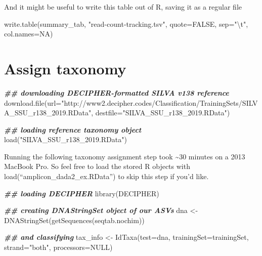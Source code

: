 \documentclass[
]{book}
\newenvironment{Shaded}{\begin{snugshade}}{\end{snugshade}}
\newcommand{\AttributeTok}[1]{\textcolor[rgb]{0.77,0.63,0.00}{#1}}
\newcommand{\ConstantTok}[1]{\textcolor[rgb]{0.00,0.00,0.00}{#1}}
\newcommand{\DocumentationTok}[1]{\textcolor[rgb]{0.56,0.35,0.01}{\textbf{\textit{#1}}}}
\newcommand{\FunctionTok}[1]{\textcolor[rgb]{0.00,0.00,0.00}{#1}}
\newcommand{\NormalTok}[1]{#1}
\newcommand{\OtherTok}[1]{\textcolor[rgb]{0.56,0.35,0.01}{#1}}
\newcommand{\SpecialCharTok}[1]{\textcolor[rgb]{0.00,0.00,0.00}{#1}}
\newcommand{\StringTok}[1]{\textcolor[rgb]{0.31,0.60,0.02}{#1}}
\begin{document}
And it might be useful to write this table out of R, saving it as a regular file

\begin{Shaded}
\begin{Highlighting}[]
\FunctionTok{write.table}\NormalTok{(summary\_tab, }\StringTok{"read{-}count{-}tracking.tsv"}\NormalTok{, }\AttributeTok{quote=}\ConstantTok{FALSE}\NormalTok{, }\AttributeTok{sep=}\StringTok{"}\SpecialCharTok{\textbackslash{}t}\StringTok{"}\NormalTok{, }\AttributeTok{col.names=}\ConstantTok{NA}\NormalTok{)}
\end{Highlighting}
\end{Shaded}

\hypertarget{assign-taxonomy}{%
\section{Assign taxonomy}\label{assign-taxonomy}}

\begin{Shaded}
\begin{Highlighting}[]
\DocumentationTok{\#\# downloading DECIPHER{-}formatted SILVA v138 reference}
\FunctionTok{download.file}\NormalTok{(}\AttributeTok{url=}\StringTok{"http://www2.decipher.codes/Classification/TrainingSets/SILVA\_SSU\_r138\_2019.RData"}\NormalTok{, }\AttributeTok{destfile=}\StringTok{"SILVA\_SSU\_r138\_2019.RData"}\NormalTok{)}

\DocumentationTok{\#\# loading reference taxonomy object}
\FunctionTok{load}\NormalTok{(}\StringTok{"SILVA\_SSU\_r138\_2019.RData"}\NormalTok{)}
\end{Highlighting}
\end{Shaded}

Running the following taxonomy assignment step took \textasciitilde30 minutes on a 2013 MacBook Pro. So feel free to load the stored R objects with load(``amplicon\_dada2\_ex.RData'') to skip this step if you'd like.

\begin{Shaded}
\begin{Highlighting}[]
\DocumentationTok{\#\# loading DECIPHER}
\FunctionTok{library}\NormalTok{(DECIPHER)}

\DocumentationTok{\#\# creating DNAStringSet object of our ASVs}
\NormalTok{dna }\OtherTok{\textless{}{-}} \FunctionTok{DNAStringSet}\NormalTok{(}\FunctionTok{getSequences}\NormalTok{(seqtab.nochim))}

\DocumentationTok{\#\# and classifying}
\NormalTok{tax\_info }\OtherTok{\textless{}{-}} \FunctionTok{IdTaxa}\NormalTok{(}\AttributeTok{test=}\NormalTok{dna, }\AttributeTok{trainingSet=}\NormalTok{trainingSet, }\AttributeTok{strand=}\StringTok{"both"}\NormalTok{, }\AttributeTok{processors=}\ConstantTok{NULL}\NormalTok{)}
\end{Highlighting}
\end{Shaded}
\end{document}
